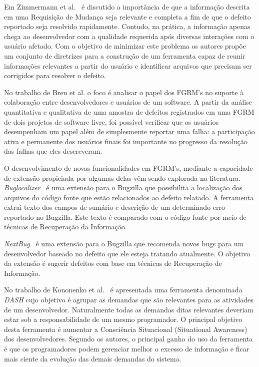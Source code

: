 Em Zimmermann et al.~\cite{5070993} é discutido a importância de que a informação descrita em uma Requisição de Mudança seja relevante e completa a fim de que o defeito reportado seja resolvido rapidamente. Contudo, na prática, a informação apenas chega ao desenvolvedor com a qualidade requerida após diversas interações com o usuário afetado. Com o objetivo de minimizar este
problema os autores propõe um conjunto de diretrizes para a construção de um ferramenta capaz de reunir informações relevantes a partir do usuário e identificar arquivos que precisam ser corrigidos para resolver o defeito.

No trabalho de Breu et al.\cite{Breu:2010:INB:1718918.1718973} o foco é analisar o papel dos FGRM's no suporte à colaboração entre desenvolvedores e usuários de um software. A partir da análise quantitativa e qualitativa de uma amostra de defeitos registrados em uma FGRM de dois projetos de software livre, foi possível verificar que os usuários desempenham um papel além de simplesmente reportar uma falha: a participação ativa e permanente dos usuários finais foi importante no progresso da resolução das falhas que eles descreveram.

O desenvolvimento de novas funcionalidades em FGRM's, mediante a capacidade de
extensão propiciada por algumas delas vêm sendo explorada na literatura. \textit{Buglocalizer}~\cite{Thung:2014:BIT:2635868.2661678} é uma extensão para o Bugzilla que possibilita a localização dos arquivos do código fonte que estão relacionados ao defeito relatado. A ferramenta extrai texto dos campos de sumário e descrição de um determinado erro reportado no Bugzilla. Este texto é comparado com o código fonte por meio de técnicas de Recuperação da Informação.

\textit{NextBug}~\cite{101186} é uma extensão para o Bugzilla que
recomenda novos bugs para um desenvolvedor baseado no defeito que ele esteja
tratando atualmente. O objetivo da extensão é sugerir defeitos com base em técnicas de
Recuperação de Informação.

No trabalho de Kononenko et al.~\cite{Kononenko:2014:DED:2591062.2591075} é
apresentada uma ferramenta denominada \textit{DASH} cujo objetivo é agrupar as
demandas que são relevantes para as atividades de um desenvolvedor. Naturalmente todas as demandas ditas relevantes deveriam estar sob a responsabilidade de um mesmo programador. O principal objetivo desta ferramenta é aumentar a Consciência Situacional (Situational Awareness) dos
desenvolvedores. Segundo os autores, o principal ganho do uso da ferramenta é
que os programadores podem gerenciar melhor o excesso de informação e ficar
mais ciente da evolução das demais demandas do sistema.

